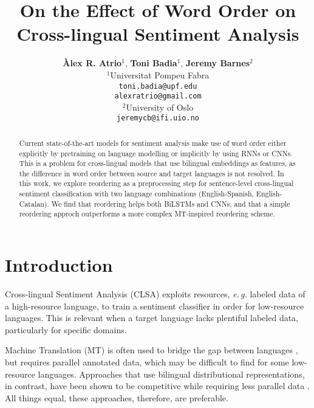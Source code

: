 \documentclass[11pt,a4paper]{article}
\title{On the Effect of Word Order on Cross-lingual Sentiment Analysis}
\author {\textbf{Àlex R. Atrio$^1$}, \textbf{Toni Badia$^{1}$}, \textbf{Jeremy Barnes$^{2}$}\\[5pt]
$^1$Universitat Pompeu Fabra\\
{\tt toni.badia@upf.edu} \\[1pt]
{\tt alexratrio@gmail.com} \\[5pt]
$^2$University of Oslo\\
{\tt jeremycb@ifi.uio.no}
}
\date{}
\newcommand{\eg}{\textit{e.\,g.}\xspace}
\begin{document}
\maketitle
\begin{abstract}
Current state-of-the-art models for sentiment analysis make use of word order
either explicitly by pretraining on language modelling or implicitly
by using RNNs or CNNs.
This is a problem for cross-lingual models that
use bilingual embeddings as features, as the difference
in word order between source and target languages is
not resolved. In this work, we explore reordering
as a preprocessing step for sentence-level cross-lingual sentiment
classification with two language combinations
(English-Spanish, English-Catalan). We find that reordering helps both BiLSTMs and CNNs, and that a simple reordering
approch outperforms a more complex MT-inspired reordering
scheme.


\end{abstract}


\section{Introduction}




Cross-lingual Sentiment Analysis (CLSA) exploits resources, \eg labeled data of a high-resource language, to train a sentiment classifier in order for low-resource languages. This is relevant when a target language lacks plentiful labeled data, particularly for specific domains. 

Machine Translation (MT) is often used to bridge the gap between languages \cite{Banea2008,Balahur2014d}, but requires parallel annotated data, which may be difficult to find for some low-resource languages. Approaches that use bilingual distributional representations, in contrast, have been shown to be competitive while requiring less parallel data \cite{Chen2016,Barnes2018b}. All things equal, these approaches, therefore, are preferable.
\end{document}

